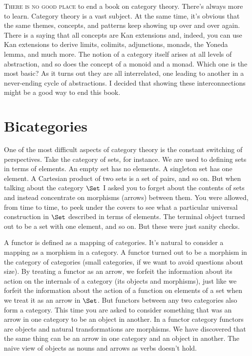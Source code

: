 
\lettrine[lhang=0.17]{T}{here is no good place} to end a book on category theory. There's always
more to learn. Category theory is a vast subject. At the same time, it's
obvious that the same themes, concepts, and patterns keep showing up
over and over again. There is a saying that all concepts are Kan
extensions and, indeed, you can use Kan extensions to derive limits,
colimits, adjunctions, monads, the Yoneda lemma, and much more. The
notion of a category itself arises at all levels of abstraction, and so
does the concept of a monoid and a monad. Which one is the most basic?
As it turns out they are all interrelated, one leading to another in a
never-ending cycle of abstractions. I decided that showing these
interconnections might be a good way to end this book.

\section{Bicategories}

One of the most difficult aspects of category theory is the constant
switching of perspectives. Take the category of sets, for instance. We
are used to defining sets in terms of elements. An empty set has no
elements. A singleton set has one element. A Cartesian product of two
sets is a set of pairs, and so on. But when talking about the category
$\Set$ I asked you to forget about the contents of sets and
instead concentrate on morphisms (arrows) between them. You were
allowed, from time to time, to peek under the covers to see what a
particular universal construction in $\Set$ described in terms of
elements. The terminal object turned out to be a set with one element,
and so on. But these were just sanity checks.

A functor is defined as a mapping of categories. It's natural to
consider a mapping as a morphism in a category. A functor turned out to
be a morphism in the category of categories (small categories, if we
want to avoid questions about size). By treating a functor as an arrow,
we forfeit the information about its action on the internals of a
category (its objects and morphisms), just like we forfeit the
information about the action of a function on elements of a set when we
treat it as an arrow in $\Set$. But functors between any two
categories also form a category. This time you are asked to consider
something that was an arrow in one category to be an object in another.
In a functor category functors are objects and natural transformations
are morphisms. We have discovered that the same thing can be an arrow in
one category and an object in another. The naive view of objects as
nouns and arrows as verbs doesn't hold.

